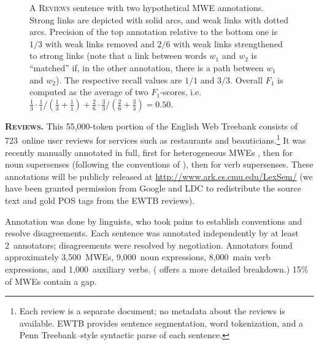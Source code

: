 \documentclass[11pt]{article}
\makeatletter
\newcommand{\ensuretext}[1]{#1}
\newcommand{\nssmarker}{\ensuretext{\textcolor{magenta}{\ensuremath{^{\textsc{NS}}_{\textsc{S}}}}}}
\newcommand{\arkcomment}[3]{\ensuretext{\textcolor{#3}{[#1 #2]}}}
\newcommand{\nss}[1]{\arkcomment{\nssmarker}{#1}{magenta}}
\newcommand{\tagtt}[3]{\begin{tabular}{@{\hspace{2pt}}c@{\hspace{2pt}}} \texttt{#2}\\ #1 \\ \texttt{#3}\end{tabular}}
\newcommand{\finalversion}[1]{}
\newcommand{\shortversion}[1]{}
\newcommand{\longversion}[1]{#1} %
\makeatother
\begin{document}
\begin{figure*}
\caption{A \textsc{Reviews} sentence with two hypothetical MWE annotations. 
Strong links are depicted with solid arcs, and weak links with dotted arcs. 
Precision of the top annotation relative to the bottom one is $1/3$ with weak links removed 
and $2/6$ with weak links strengthened to strong links (note that a link between words $w_1$ and $w_2$ is ``matched'' 
if, in the other annotation, there is a path between $w_1$ and $w_2$). 
The respective recall values are $1/1$ and $3/3$. 
Overall $F_1$ is computed as the average of two $F_1$-scores, i.e.~$\tfrac{1}{3} \cdot \tfrac{1}{1}/(\tfrac{1}{3} + \tfrac{1}{1}) + \tfrac{2}{6}\cdot \tfrac{3}{3}/(\tfrac{2}{6}+\tfrac{3}{3}) = 0.50$.}
\label{fig:linkmeasure}
\end{figure*}

\textbf{\textsc{Reviews}.} This 55,000-token portion of the English Web Treebank \citep[EWTB;][]{ewtb} 
consists of 723~online user reviews for services such as restaurants and beauticians.\longversion{\footnote{Each review is a separate document; 
no metadata about the reviews is available. EWTB provides sentence segmentation, word tokenization, and a Penn Treebank--style 
syntactic parse of each sentence.}}
It was recently manually annotated in full, first for heterogeneous MWEs \citep[released as the CMWE Corpus]{schneider-14-corpus}, 
then for noun supersenses (following the conventions of \citealp{schneider-12}), then for verb supersenses.
These annotations will be publicly released at \url{http://www.ark.cs.cmu.edu/LexSem/} 
(we have been granted permission from Google and LDC 
to redistribute the source text and gold POS tags from the EWTB reviews). 

Annotation was done by linguists, who took pains to establish conventions and resolve disagreements.
Each sentence was annotated independently by at least 2~annotators; disagreements were resolved by negotiation. 
\longversion{Annotators found approximately 3,500~MWEs, 9,000~noun expressions, 8,000~main verb expressions, and 1,000~auxiliary verbs. 
(\Cref{tbl:reviews} offers a more detailed breakdown.)}\shortversion{\Cref{tbl:reviews}  
offers a breakdown of the annotations.}
\longversion{15\% of MWEs contain a gap.\finalversion{\nss{proportion strong/weak}}} 
\end{document}
